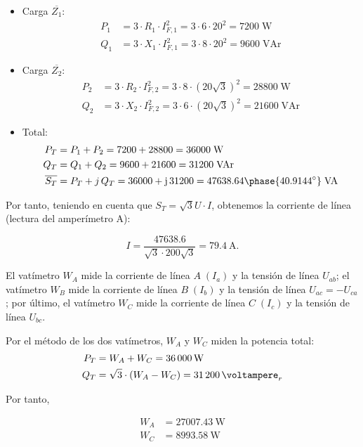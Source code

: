 \begin{itemize}
    \item Carga $\overline{Z_1}$:
    \begin{align*}
        P_1&=3\cdot R_1\cdot I_{F,1}^2=3\cdot 6\cdot 20^2=7200\;\text{W}\\
        Q_1&=3\cdot X_1\cdot I_{F,1}^2=3\cdot 8\cdot 20^2=9600\;\text{VAr}
    \end{align*}
    \item Carga $\overline{Z_2}$:
    \begin{align*}
        P_2&=3\cdot R_2\cdot I_{F,2}^2=3\cdot 8\cdot (20\sqrt{3})^2=28800\;\text{W}\\
        Q_2&=3\cdot X_2\cdot I_{F,2}^2=3\cdot 6\cdot (20\sqrt{3})^2=21600\;\text{VAr}
    \end{align*}
    \item Total:
    \begin{align*}
        P_T&=P_1+P_2=7200+28800=36000\;\text{W}\\
        Q_T&=Q_1+Q_2=9600+21600=31200\;\text{VAr}\\
        \overline{S_T}&=P_T+j\,Q_T={36000+\mathrm{j}\,31200 = 47638.64\phase{40.9144^\circ} \;\text{VA}}
    \end{align*}
\end{itemize}

Por tanto, teniendo en cuenta que $S_T = \sqrt{3} U \cdot I$, obtenemos la corriente de línea (lectura del amperímetro A):

\begin{equation*}
  I = \frac{47638.6}{\sqrt{3} \cdot 200\sqrt{3}} = \qty{79.4}{\ampere}.
\end{equation*}


El vatímetro $W_A$ mide la corriente de línea $A\;(I_a)$ y la tensión de línea $U_{ab}$; el vatímetro $W_B$ mide la corriente de línea $B\;(I_b)$ y la tensión de línea $U_{ac}=-U_{ca}$; por último, el vatímetro $W_C$ mide la corriente de línea $C\;(I_c)$ y la tensión de línea $U_{bc}$.

Por el método de los dos vatímetros, $W_A$ y $W_C$ miden la potencia total: 
\begin{align*}
  P_T &= W_A + W_C =\qty{36000}{\watt}\\
  Q_T &= \sqrt{3}\cdot (W_A - W_C) = \qty{31200}{\voltampere}_r
\end{align*}

Por tanto,

\begin{align*}
  W_A &= \qty{27007.43}{\watt}\\
  W_C &= \qty{8993.58}{\watt}
\end{align*}

